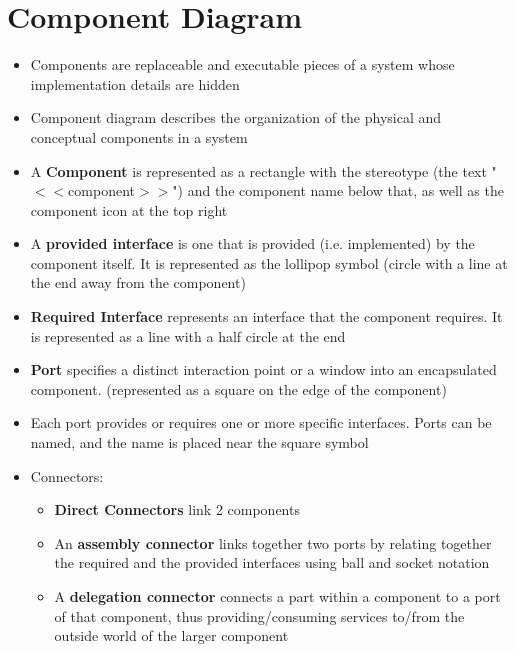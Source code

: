 \documentclass{article}
\begin{document}
\section{Component Diagram}
\begin{itemize}
    \item Components are replaceable and executable pieces of a system whose implementation details are hidden
    
    \item Component diagram describes the organization of the physical and conceptual components in a system

    \item A \textbf{Component} is represented as a rectangle with the stereotype (the text "$<<$component$>>$") and the component name below that, as well as the component icon at the top right
    
    \item A \textbf{provided interface} is one that is provided (i.e. implemented) by the component itself. It is represented as the lollipop symbol (circle with a line at the end away from the component)
    
    \item \textbf{Required Interface} represents an interface that the component requires. It is represented as a line with a half circle at the end
    
    \item \textbf{Port} specifies a distinct interaction point or a window into an encapsulated component. (represented as a square on the edge of the component)
    
    \item Each port provides or requires one or more specific interfaces. Ports can be named, and the name is placed near the square symbol
    
    \item Connectors:
    \begin{itemize}
        \item \textbf{Direct Connectors} link 2 components
        
        \item An \textbf{assembly connector} links together two ports by relating together the required and the provided interfaces using ball and socket notation
        
        \item A \textbf{delegation connector} connects a part within a component to a port of that component, thus providing/consuming services to/from the outside world of the larger component
    \end{itemize}
\end{itemize}
\end{document}
